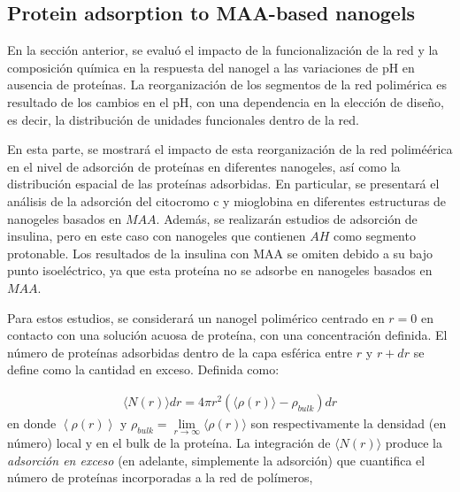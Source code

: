 \subsection{Protein adsorption to MAA-based nanogels}\label{sec:MAA-NGs}






En la secci\'on anterior, se evalu\'o el impacto de la funcionalizaci\'on de la red y la composici\'on qu\'imica en la respuesta del nanogel a las variaciones de pH en ausencia de prote\'inas. La reorganizaci\'on de los segmentos de la red polim\'erica es resultado de los cambios en el pH, con una dependencia en la elecci\'on de dise\~no, es decir, la distribuci\'on de unidades funcionales dentro de la red.

En esta parte, se mostrar\'a el impacto de esta reorganizaci\'on de la red polimé\'erica en el nivel de adsorci\'on de prote\'inas en diferentes nanogeles, as\'i como la distribuci\'on espacial de las prote\'inas adsorbidas. En particular, se presentar\'a el an\'alisis de la adsorci\'on del citocromo c y mioglobina en diferentes estructuras de nanogeles basados en $MAA$. Adem\'as, se realizar\'an estudios de adsorci\'on de insulina, pero en este caso con nanogeles que contienen $AH$ como segmento protonable. Los resultados de la insulina con MAA se omiten debido a su bajo punto isoel\'ectrico, ya que esta prote\'ina no se adsorbe en nanogeles basados en $MAA$.

Para estos estudios, se considerar\'a un nanogel polim\'erico centrado en $r=0$ en contacto con una soluci\'on acuosa de prote\'ina, con una concentraci\'on definida. El n\'umero de prote\'inas adsorbidas dentro de la capa esf\'erica entre $r$ y $r+dr$ se define como la cantidad en exceso. 
Definida como:


\begin{align}
     \langle N(r)\rangle dr = 4\pi r^2 \left(\langle\rho(r)\rangle - \rho_{bulk}\right) dr
\end{align}
%
en donde $\left<\rho(r)\right>$ y $\rho_{bulk}=\lim\limits_{r\to \infty } \langle\rho(r)\rangle$ son respectivamente la densidad (en n\'umero) local y en el bulk de la prote\'ina.
La integraci\'on de $\langle N(r)\rangle$ produce la \emph{adsorci\'on en exceso} (en adelante, simplemente la adsorci\'on) que cuantifica el n\'umero de prote\'inas incorporadas a la red de pol\'imeros,


